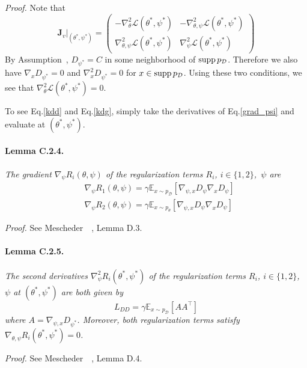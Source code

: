 \emph{Proof.} Note that
\begin{equation}
\textbf{J}_v\biggr\rvert_{(\theta^*,\psi^*)}=\begin{pmatrix}
-\nabla^2_\theta\mathcal{L}(\theta^*,\psi^*) & -\nabla^2_{\theta,\psi}\mathcal{L}(\theta^*,\psi^*) \\ 
\nabla^2_{\theta,\psi}\mathcal{L}(\theta^*,\psi^*) & \nabla^2_\psi\mathcal{L}(\theta^*,\psi^*)
\end{pmatrix}
\end{equation}
By Assumption~, $D_{\psi^*}=C$ in some neighborhood of $\operatorname{supp} p_\mathcal{D}$. Therefore we also have $\nabla_x D_{\psi^*}=0$ and $\nabla^2_x D_{\psi^*}=0$ for $x\in\operatorname{supp} p_\mathcal{D}$. Using these two conditions, we see that $\nabla^2_\theta\mathcal{L}(\theta^*,\psi^*)=0$.

To see Eq.\ref{kdd} and Eq.\ref{kdg}, simply take the derivatives of Eq.\ref{grad_psi} and evaluate at $(\theta^*,\psi^*)$.

\paragraph{Lemma C.2.4.} \emph{The gradient $\nabla_\psi R_i(\theta,\psi)$ of the regularization terms $R_i$, $i\in\{1,2\}$,~\wrt $\psi$ are}
\begin{align}
&\nabla_\psi R_1(\theta,\psi)=\gamma\mathbb{E}_{x\sim p_\mathcal{D}}[\nabla_{\psi,x}D_\psi\nabla_xD_\psi] \\
&\nabla_\psi R_2(\theta,\psi)=\gamma\mathbb{E}_{x\sim p_\theta}[\nabla_{\psi,x}D_\psi\nabla_xD_\psi]
\end{align}

\emph{Proof.} See Mescheder~\etal~\cite{r1}, Lemma D.3.

\paragraph{Lemma C.2.5.} \emph{The second derivatives $\nabla^2_\psi R_i(\theta^*,\psi^*)$ of the regularization terms $R_i$, $i\in\{1,2\}$,~\wrt $\psi$ at $(\theta^*,\psi^*)$ are both given by}
\begin{equation}
L_{DD}=\gamma\mathbb{E}_{x\sim p_\mathcal{D}}[AA^\top]
\end{equation}
\emph{where $A=\nabla_{\psi,x}D_{\psi^*}$. Moreover, both regularization terms satisfy $\nabla_{\theta,\psi}R_i(\theta^*,\psi^*)=0$.}

\emph{Proof.} See Mescheder~\etal~\cite{r1}, Lemma D.4.

